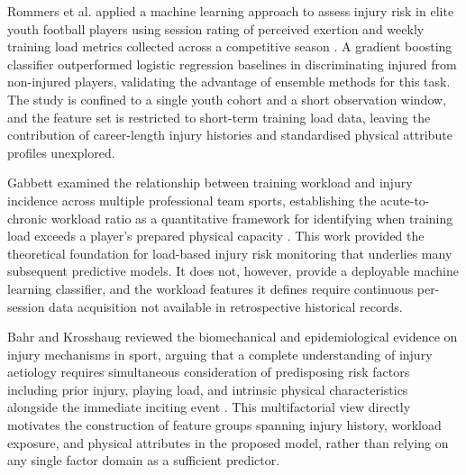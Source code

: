 \documentclass[conference]{IEEEtran}
\begin{document}
Rommers et al. applied a machine learning approach to assess injury risk in elite youth football players using session rating of perceived exertion and weekly training load metrics collected across a competitive season \cite{rommers2020machine}. A gradient boosting classifier outperformed logistic regression baselines in discriminating injured from non-injured players, validating the advantage of ensemble methods for this task. The study is confined to a single youth cohort and a short observation window, and the feature set is restricted to short-term training load data, leaving the contribution of career-length injury histories and standardised physical attribute profiles unexplored.

Gabbett examined the relationship between training workload and injury incidence across multiple professional team sports, establishing the acute-to-chronic workload ratio as a quantitative framework for identifying when training load exceeds a player's prepared physical capacity \cite{gabbett2016training}. This work provided the theoretical foundation for load-based injury risk monitoring that underlies many subsequent predictive models. It does not, however, provide a deployable machine learning classifier, and the workload features it defines require continuous per-session data acquisition not available in retrospective historical records.

Bahr and Krosshaug reviewed the biomechanical and epidemiological evidence on injury mechanisms in sport, arguing that a complete understanding of injury aetiology requires simultaneous consideration of predisposing risk factors including prior injury, playing load, and intrinsic physical characteristics alongside the immediate inciting event \cite{bahr2005understanding}. This multifactorial view directly motivates the construction of feature groups spanning injury history, workload exposure, and physical attributes in the proposed model, rather than relying on any single factor domain as a sufficient predictor.
\end{document}
